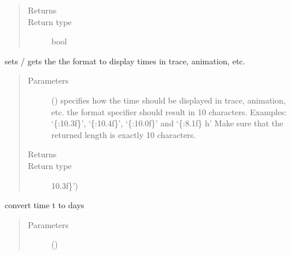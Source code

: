 \documentclass[letterpaper,10pt,english]{sphinxmanual}
\begin{document}
\begin{fulllineitems}
\begin{fulllineitems}
\begin{quote}
\begin{description}
\item[{Returns}] \leavevmode
{}

\item[{Return type}] \leavevmode
bool

\end{description}\end{quote}

\end{fulllineitems}


\begin{fulllineitems}
\label{\detokenize{Reference:salabim.Environment.time_to_str_format}}
sets / gets the the format to display times in trace, animation, etc.
\begin{quote}\begin{description}
\item[{Parameters}] \leavevmode
{} () \textendash{} specifies how the time should be displayed in trace, animation, etc. 
the format specifier should result in 10 characters. Examples: 
‘\{:10.3f\}’, ‘\{:10.4f\}’, ‘\{:10.0f\}’ and ‘\{:8.1f\} h’ 
Make sure that the returned length is exactly 10 characters.

\item[{Returns}] \leavevmode
{}

\item[{Return type}] \leavevmode
10.3f\}’)

\end{description}\end{quote}

\end{fulllineitems}


\begin{fulllineitems}
\label{\detokenize{Reference:salabim.Environment.to_days}}
convert time t to days
\begin{quote}\begin{description}
\item[{Parameters}] \leavevmode
{} () \textendash{} 


\end{description}
\end{quote}
\end{fulllineitems}
\end{fulllineitems}
\end{document}
